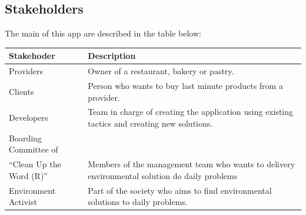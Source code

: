 \subsection{Stakeholders} 

The main  of this app are described in the table below:

\begin{table}[H]
    \begin{tabularx}{\textwidth}{lX}
    \toprule
    Stakehoder & Description   \\
    \midrule
    Providers & Owner of a restaurant, bakery or pastry. \\
    Clients & Person who wants to buy last minute products from a provider. \\
    Developers & Team in charge of creating the application using existing tactics and creating new solutions. \\
    Boarding Committee of \\ ``Clean Up the Word (R)'' & Members of the management team who wants to delivery 
    environmental solution do daily problems \\
    Environment Activist & Part of the society who aims to find environmental solutions to daily problems. \\
    \bottomrule
    \end{tabularx}
\end{table}